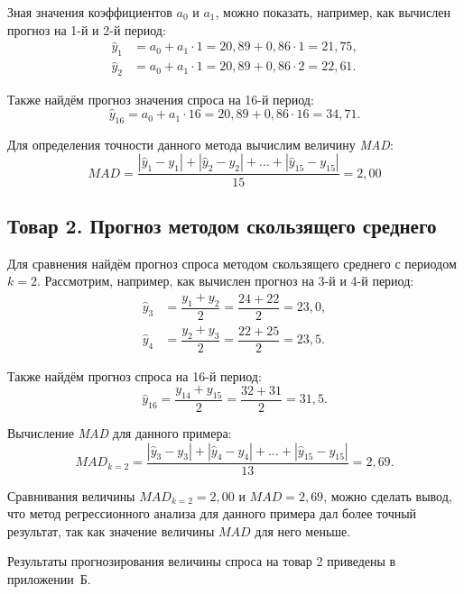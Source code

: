 Зная значения коэффициентов $a_0$ и $a_1$, можно показать, например, как
вычислен прогноз на 1-й и 2-й период:
\begin{align*}
  \hat{y}_1 &= a_0 + a_1 \cdot 1 = 20{,}89 + 0{,}86 \cdot 1 = 21{,}75, \\
  \hat{y}_2 &= a_0 + a_1 \cdot 1 = 20{,}89 + 0{,}86 \cdot 2 = 22{,}61.
\end{align*}

Также найдём прогноз значения спроса на 16-й период:
\begin{equation*}
  \hat{y}_{16} = a_0 + a_1 \cdot 16 = 20{,}89 + 0{,}86 \cdot 16 = 34{,}71.
\end{equation*}

Для определения точности данного метода вычислим величину \textit{MAD}:
\[
  MAD = \dfrac{|\hat{y}_1 - y_1| + |\hat{y}_2 - y_2| + \dots + |\hat{y}_{15} - y_{15}|}{15} = 2{,}00
\]


\subsection{Товар 2. Прогноз методом скользящего среднего}

Для сравнения найдём прогноз спроса методом скользящего среднего
с периодом $k = 2$. Рассмотрим, например, как вычислен прогноз
на 3-й и 4-й период:
\begin{align*}
  \hat{y}_3 &= \dfrac{y_1 + y_2}{2} = \dfrac{24 + 22}{2} = 23{,}0, \\
  \hat{y}_4 &= \dfrac{y_2 + y_3}{2} = \dfrac{22 + 25}{2} = 23{,}5.
\end{align*}

Также найдём прогноз спроса на 16-й период:
\begin{equation*}
  \hat{y}_{16} = \dfrac{y_{14} + y_{15}}{2} = \dfrac{32 + 31}{2} = 31{,}5.
\end{equation*}

Вычисление \textit{MAD} для данного примера:
\[
  MAD_{k = 2} = \dfrac{|\hat{y}_3 - y_3| + |\hat{y}_4 - y_4| + \dots + |\hat{y}_{15} - y_{15}|}{13} = 2{,}69.
\]

Сравнивания величины $MAD_{k = 2} = 2{,}00$ и $MAD = 2{,}69$, можно сделать вывод, что
метод регрессионного анализа для данного примера дал более точный результат, так как
значение величины $MAD$ для него меньше.

Результаты прогнозирования величины спроса на товар 2 приведены в приложении~Б.
